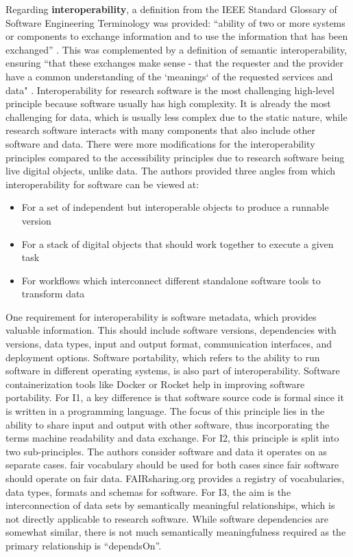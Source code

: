 Regarding \textbf{interoperability}, a definition from the IEEE Standard Glossary of Software Engineering Terminology was provided: “ability of two or more systems or components to exchange information and to use the information that has been exchanged” \cite{noauthor_ieee_1990}. This was complemented by a definition of semantic interoperability, ensuring “that these exchanges make sense - that the requester and the provider have a common understanding of the ‘meanings‘ of the requested services and data" \cite{heiler_semantic_1995}. Interoperability for research software is the most challenging high-level principle because software usually has high complexity. It is already the most challenging for data, which is usually less complex due to the static nature, while research software interacts with many components that also include other software and data. There were more modifications for the interoperability principles compared to the accessibility principles due to research software being live digital objects, unlike data. The authors provided three angles from which interoperability for software can be viewed at:
\begin{itemize}
    \item For a set of independent but interoperable objects to produce a runnable version
    \item For a stack of digital objects that should work together to execute a given task
    \item For workflows which interconnect different standalone software tools to transform data
\end{itemize}

One requirement for interoperability is software metadata, which provides valuable information. This should include software versions, dependencies with versions, data types, input and output format, communication interfaces, and deployment options. Software portability, which refers to the ability to run software in different operating systems, is also part of interoperability. Software containerization tools like Docker or Rocket help in improving software portability. For I1, a key difference is that software source code is formal since it is written in a programming language. The focus of this principle lies in the ability to share input and output with other software, thus incorporating the terms machine readability and data exchange. For I2, this principle is split into two sub-principles. The authors consider software and data it operates on as separate cases. \acrshort{fair} vocabulary should be used for both cases since \acrshort{fair} software should operate on \acrshort{fair} data. FAIRsharing.org provides a registry of vocabularies, data types, formats and schemas for software. For I3, the aim is the interconnection of data sets by semantically meaningful relationships, which is not directly applicable to research software. While software dependencies are somewhat similar, there is not much semantically meaningfulness required as the primary relationship is “dependsOn”.

